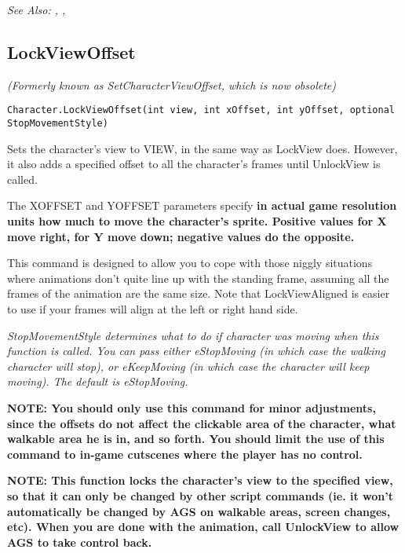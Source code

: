 \it{See Also:} ,
,


\subsection{LockViewOffset}\label{Character.LockViewOffset}%

\it{(Formerly known as SetCharacterViewOffset, which is now obsolete)}

\begin{verbatim}
Character.LockViewOffset(int view, int xOffset, int yOffset, optional StopMovementStyle)
\end{verbatim}

Sets the character's view to VIEW, in the same way as LockView does. However,
it also adds a specified offset to all the character's frames until UnlockView
is called.

The XOFFSET and YOFFSET parameters specify \bf{in actual game resolution units} how much
to move the character's sprite. Positive values for X move right, for Y move down; negative
values do the opposite.

This command is designed to allow you to cope with those niggly situations where animations
don't quite line up with the standing frame, assuming all the frames of the animation are
the same size. Note that LockViewAligned is easier to use if your frames will align at
the left or right hand side.

\it{StopMovementStyle} determines what to do if character was moving when this function is called. You can pass either eStopMoving (in which case the walking character will stop), or eKeepMoving (in which case the character will keep moving). The default is eStopMoving.

\bf{NOTE:} You should only use this command for minor adjustments, since the offsets do not
affect the clickable area of the character, what walkable area he is in, and so forth. You
should limit the use of this command to in-game cutscenes where the player has no control.

\bf{NOTE:} This function locks the character's view to the specified view, so
that it can only be changed by other script commands (ie. it won't
automatically be changed by AGS on walkable areas, screen changes, etc). When
you are done with the animation, call UnlockView to allow AGS to take control back.

